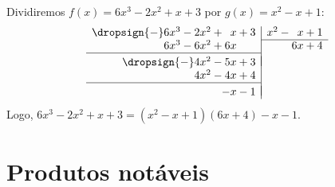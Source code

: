 
\begin{exe}
	Dividiremos $f(x)=6x^3-2x^2+x+3$ por $g(x)=x^2-x+1$:
\[
\begin{array}{r|r}
	\dropsign{-} 6x^3 - 2x^2 + \phantom{6}x + 3 & x^2 - \phantom{6}x + 1 \\ \cline{2-2}
	6x^3 - 6x^2 + 6x \phantom{{}+3} & 6x + 4 \\ \cline{1-1} \\[\dimexpr-\normalbaselineskip+\jot]
	\dropsign{-} 4x^2 - 5x + 3 \\
	4x^2 - 4x + 4 \\ \cline{1-1} \\[\dimexpr-\normalbaselineskip+\jot]
	-  x - 1
\end{array}
\]
Logo, $6x^3-2x^2+x+3=(x^2-x+1)(6x+4)-x-1$.
\end{exe}





\section{Produtos notáveis}

